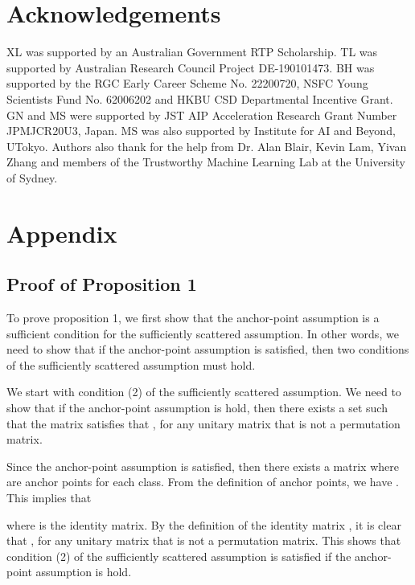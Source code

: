 \documentclass{article}
\begin{document}
\section*{Acknowledgements}
XL was supported by an Australian Government RTP Scholarship. TL was supported by Australian Research Council Project DE-190101473. BH was supported by the RGC Early Career Scheme No. 22200720, NSFC Young Scientists Fund No. 62006202 and HKBU CSD Departmental Incentive Grant. GN and MS were supported by JST AIP Acceleration Research Grant Number JPMJCR20U3, Japan. MS was also supported by Institute for AI and Beyond, UTokyo. Authors also thank for the help from Dr. Alan Blair, Kevin Lam, Yivan Zhang and members of the Trustworthy Machine Learning Lab at the University of Sydney. 








\clearpage

\appendix
\section{Appendix}
\subsection{Proof of Proposition 1}
To prove proposition 1, we first show that the anchor-point assumption is a sufficient condition for the sufficiently scattered assumption. In other words, we need to show that if the anchor-point assumption is satisfied, then two conditions of the sufficiently scattered assumption must hold.

We start with condition (2) of the sufficiently scattered assumption. We need to show that if the anchor-point assumption is hold, then there exists a set  such that the matrix  satisfies that , \;for any unitary matrix  that is not a permutation matrix. 

Since the anchor-point assumption is satisfied, then there exists a matrix   where  are anchor points for each class. From the definition of anchor points, we have . This implies that
 


where  is the identity matrix. By the definition of the identity matrix , it is clear that , \;for any unitary matrix  that is not a permutation matrix. This shows that condition (2) of the sufficiently scattered assumption is satisfied if the anchor-point assumption is hold. 
\end{document}
